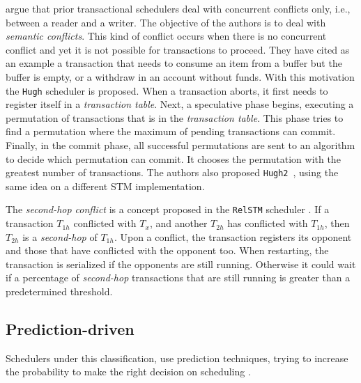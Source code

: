  argue that prior transactional schedulers deal with concurrent conflicts only, i.e., between a reader and a writer. The objective of the authors is to deal with \emph{semantic conflicts}. This kind of conflict occurs when there is no concurrent conflict and yet it is not possible for transactions to proceed. They have cited as an example a transaction that needs to consume an item from a buffer but the buffer is empty, or a withdraw in an account without funds. With this motivation the \texttt{Hugh} scheduler is proposed. When a transaction aborts, it first needs to register itself in a \emph{transaction table}. Next, a speculative phase begins, executing a permutation of transactions that is in the \emph{transaction table}. This phase tries to find a permutation where the maximum of pending transactions can commit. Finally, in the commit phase, all successful permutations are sent to an algorithm to decide which permutation can commit. It chooses the permutation with the greatest number of transactions. The authors also proposed \texttt{Hugh2}~\cite{Sharp:2014}, using the same idea on a different STM implementation.

The \emph{second-hop conflict} is a concept proposed in the \texttt{RelSTM} scheduler \cite{Sainz:2013}. If a transaction $T_{1h}$ conflicted with $T_x$, and another $T_{2h}$ has conflicted with $T_{1h}$, then $T_{2h}$ is a \emph{second-hop} of $T_{1h}$. Upon a conflict, the transaction registers its opponent and those that have conflicted with the opponent too. When restarting, the transaction is serialized if the opponents are still running. Otherwise it could wait if a percentage of \emph{second-hop} transactions that are still running is greater than a predetermined threshold. 

\subsection{Prediction-driven}\label{sec:prediction}

Schedulers under this classification, use prediction techniques, trying to increase the probability to make the right decision on  scheduling \cite{Sanzo:2017}.

